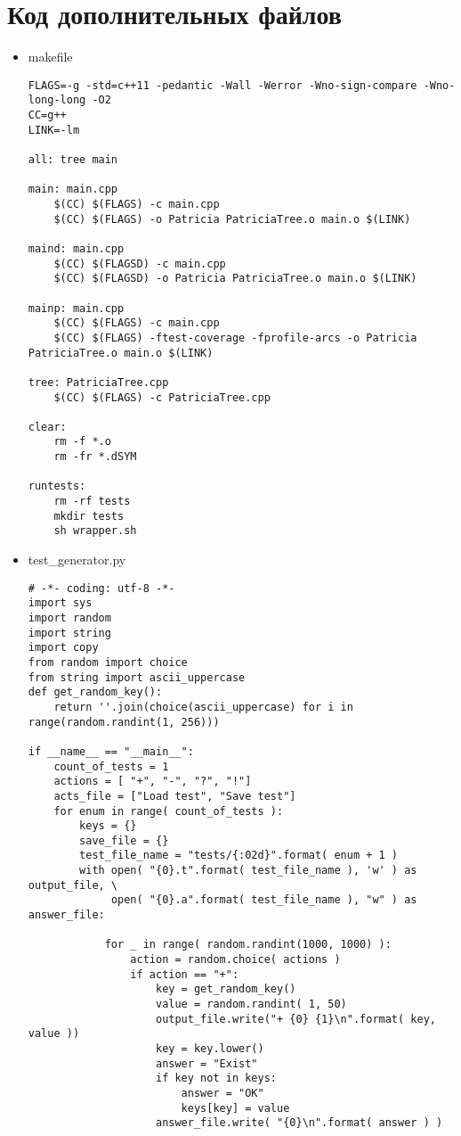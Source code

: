 \documentclass[pdf, unicode, 12pt, a4paper,oneside,fleqn]{article}
\begin{document}
\section{Код дополнительных файлов}
\lstset{language=BASH}
\begin{itemize}
\item makefile
\begin{lstlisting}
FLAGS=-g -std=c++11 -pedantic -Wall -Werror -Wno-sign-compare -Wno-long-long -O2
CC=g++
LINK=-lm

all: tree main

main: main.cpp
	$(CC) $(FLAGS) -c main.cpp
	$(CC) $(FLAGS) -o Patricia PatriciaTree.o main.o $(LINK)

maind: main.cpp
	$(CC) $(FLAGSD) -c main.cpp
	$(CC) $(FLAGSD) -o Patricia PatriciaTree.o main.o $(LINK)

mainp: main.cpp
	$(CC) $(FLAGS) -c main.cpp
	$(CC) $(FLAGS) -ftest-coverage -fprofile-arcs -o Patricia PatriciaTree.o main.o $(LINK)

tree: PatriciaTree.cpp
	$(CC) $(FLAGS) -c PatriciaTree.cpp

clear:
	rm -f *.o
	rm -fr *.dSYM

runtests:
	rm -rf tests
	mkdir tests
	sh wrapper.sh
\end{lstlisting}
\newpage
\item test\_generator.py
\lstset{language=Python}
\begin{lstlisting}
# -*- coding: utf-8 -*-
import sys
import random
import string
import copy
from random import choice
from string import ascii_uppercase
def get_random_key():
    return ''.join(choice(ascii_uppercase) for i in range(random.randint(1, 256)))

if __name__ == "__main__":
    count_of_tests = 1
    actions = [ "+", "-", "?", "!"]
    acts_file = ["Load test", "Save test"]
    for enum in range( count_of_tests ):
        keys = {}
        save_file = {}
        test_file_name = "tests/{:02d}".format( enum + 1 )
        with open( "{0}.t".format( test_file_name ), 'w' ) as output_file, \
             open( "{0}.a".format( test_file_name ), "w" ) as answer_file:

            for _ in range( random.randint(1000, 1000) ):
                action = random.choice( actions )
                if action == "+":
                    key = get_random_key()
                    value = random.randint( 1, 50)
                    output_file.write("+ {0} {1}\n".format( key, value ))
                    key = key.lower()
                    answer = "Exist"
                    if key not in keys:
                        answer = "OK"
                        keys[key] = value
                    answer_file.write( "{0}\n".format( answer ) )


\end{lstlisting}
\end{itemize}
\end{document}

